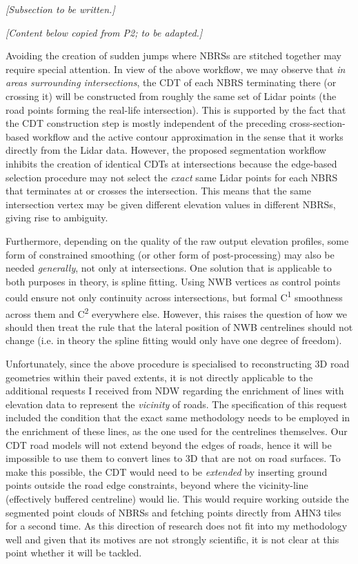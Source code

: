 \textit{[Subsection to be written.]}

\textit{[Content below copied from P2; to be adapted.]}

Avoiding the creation of sudden jumps where NBRSs are stitched together may require special attention. In view of the above workflow, we may observe that \textit{in areas surrounding intersections}, the CDT of each NBRS terminating there (or crossing it) will be constructed from roughly the same set of Lidar points (the road points forming the real-life intersection). This is supported by the fact that the CDT construction step is mostly independent of the preceding cross-section-based workflow and the active contour approximation in the sense that it works directly from the Lidar data. However, the proposed segmentation workflow inhibits the creation of identical CDTs at intersections because the edge-based selection procedure may not select the \textit{exact} same Lidar points for each NBRS that terminates at or crosses the intersection. This means that the same intersection vertex may be given different elevation values in different NBRSs, giving rise to ambiguity. 

Furthermore, depending on the quality of the raw output elevation profiles, some form of constrained smoothing (or other form of post-processing) may also be needed \textit{generally}, not only at intersections. One solution that is applicable to both purposes in theory, is spline fitting. Using NWB vertices as control points could ensure not only continuity across intersections, but formal C\textsuperscript{1} smoothness across them and C\textsuperscript{2} everywhere else. However, this raises the question of how we should then treat the rule that the lateral position of NWB centrelines should not change (i.e. in theory the spline fitting would only have one degree of freedom).

Unfortunately, since the above procedure is specialised to reconstructing 3D road geometries within their paved extents, it is not directly applicable to the additional requests I received from NDW regarding the enrichment of lines with elevation data to represent the \textit{vicinity} of roads. The specification of this request included the condition that the exact same methodology needs to be employed in the enrichment of these lines, as the one used for the centrelines themselves. Our CDT road models will not extend beyond the edges of roads, hence it will be impossible to use them to convert lines to 3D that are not on road surfaces. To make this possible, the CDT would need to be \textit{extended} by inserting ground points outside the road edge constraints, beyond where the vicinity-line (effectively buffered centreline) would lie. This would require working outside the segmented point clouds of NBRSs and fetching points directly from AHN3 tiles for a second time. As this direction of research does not fit into my methodology well and given that its motives are not strongly scientific, it is not clear at this point whether it will be tackled.


